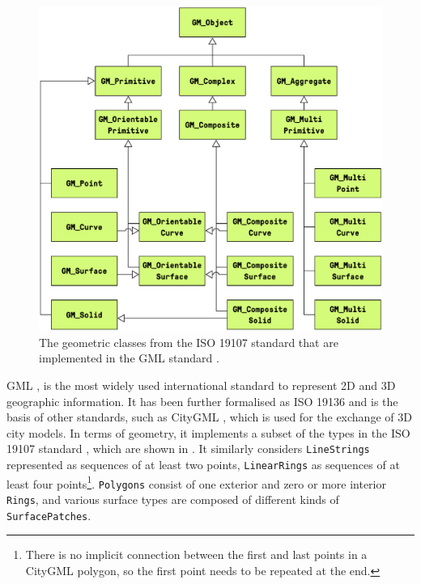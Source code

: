 \begin{figure}[t]
  \begin{center}
    \includegraphics[width=\linewidth]{figs/gml}
  \end{center}
  \caption[Geometry in GML]{The geometric classes from the ISO 19107 standard \citep{ISO19107:2005} that are implemented in the GML standard \citep{GML3.2.1}.}
\label{fig:gml}
\end{figure}

GML \citep{GML3.3}, is the most widely used international standard to represent 2D and 3D geographic information.
It has been further formalised as ISO 19136 \citep{ISO19136:2007} and is the basis of other standards, such as CityGML \citep{CityGML2}, which is used for the exchange of 3D city models.
In terms of geometry, it implements a subset of the types in the ISO 19107 standard \citep{ISO19107:2005}, which are shown in .
It similarly considers \texttt{LineStrings} represented as sequences of at least two points, \texttt{LinearRings} as sequences of at least four points\footnote{There is no implicit connection between the first and last points in a CityGML polygon, so the first point needs to be repeated at the end.}.
\texttt{Polygons} consist of one exterior and zero or more interior \texttt{Rings}, and various surface types are composed of different kinds of \texttt{SurfacePatches}.

